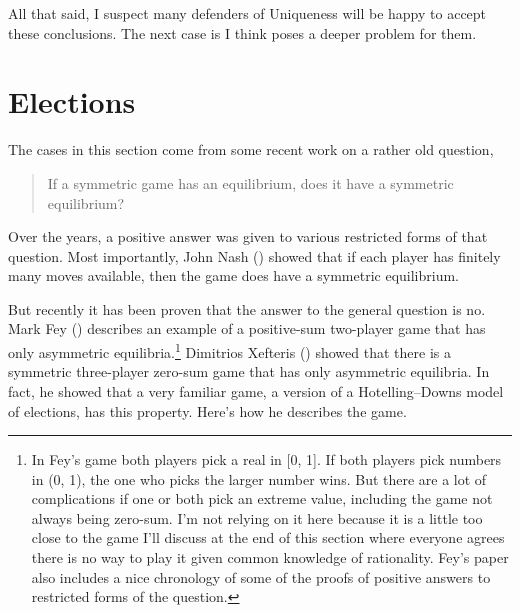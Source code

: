 \documentclass[
  10pt,
  letterpaper,
  DIV=11,
  numbers=noendperiod,
  twoside]{scrartcl}
\begin{document}
All that said, I suspect many defenders of Uniqueness will be happy to
accept these conclusions. The next case is I think poses a deeper
problem for them.

\section{Elections}\label{elections}

The cases in this section come from some recent work on a rather old
question,

\begin{quote}
If a symmetric game has an equilibrium, does it have a symmetric
equilibrium?
\end{quote}

Over the years, a positive answer was given to various restricted forms
of that question. Most importantly, John Nash
() showed that if each player has finitely
many moves available, then the game does have a symmetric equilibrium.

But recently it has been proven that the answer to the general question
is no. Mark Fey () describes an example of a
positive-sum two-player game that has only asymmetric
equilibria.\footnote{In Fey's game both players pick a real in {[}0,
  1{]}. If both players pick numbers in (0, 1), the one who picks the
  larger number wins. But there are a lot of complications if one or
  both pick an extreme value, including the game not always being
  zero-sum. I'm not relying on it here because it is a little too close
  to the game I'll discuss at the end of this section where everyone
  agrees there is no way to play it given common knowledge of
  rationality. Fey's paper also includes a nice chronology of some of
  the proofs of positive answers to restricted forms of the question.}
Dimitrios Xefteris () showed that there
is a symmetric three-player zero-sum game that has only asymmetric
equilibria. In fact, he showed that a very familiar game, a version of a
Hotelling--Downs model of elections, has this property. Here's how he
describes the game.
\end{document}
